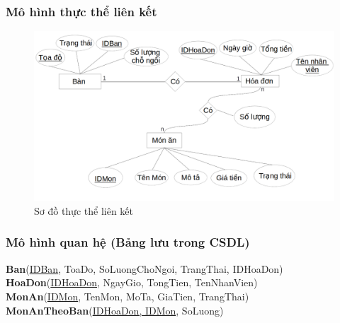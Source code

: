 \documentclass[a4paper,12pt]{report}
\begin{document}
\subsubsection{Mô hình thực thể liên kết}
\begin{figure}[!]
\centering
\includegraphics[scale=0.4]{DuLieu.png}
\caption{Sơ đồ thực thể liên kết}
\end{figure}
\subsubsection{Mô hình quan hệ (Bảng lưu trong CSDL)}
\textbf{Ban}(\underline{IDBan}, ToaDo, SoLuongChoNgoi, TrangThai, IDHoaDon)\\
\textbf{HoaDon}(\underline{IDHoaDon}, NgayGio, TongTien, TenNhanVien)\\
\textbf{MonAn}(\underline{IDMon}, TenMon, MoTa, GiaTien, TrangThai)\\  
\textbf{MonAnTheoBan}(\underline{IDHoaDon, IDMon}, SoLuong) 
\end{document}
